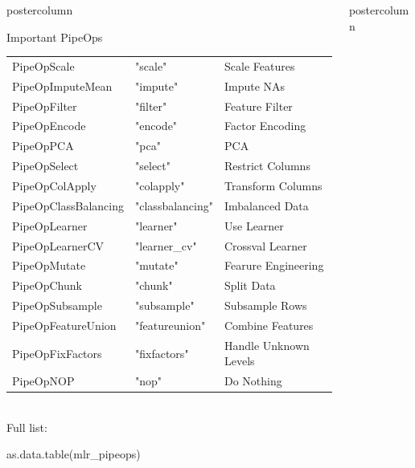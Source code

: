 \documentclass{beamer}
\newcommand{\codeinline}[1]{\begin{codeboxinline}#1\end{codeboxinline}}
\begin{document}
\begin{frame}[fragile]{}
\begin{columns}
\begin{column}{.245\textwidth}
\begin{beamercolorbox}[center]{postercolumn}
\begin{minipage}{.98\textwidth}
{\begin{myblock}{Important PipeOps}
\begin{footnotesize}
\begin{centering}
\begin{tabular}{l l l}
                    PipeOpScale & "scale" & Scale Features\\
                    PipeOpImputeMean & "impute" & Impute NAs\\
                    PipeOpFilter & "filter" & Feature Filter\\
                    PipeOpEncode & "encode" & Factor Encoding\\
                    PipeOpPCA & "pca" & PCA\\
                    PipeOpSelect & "select" & Restrict Columns\\ 
                    PipeOpColApply & "colapply" & Transform Columns\\ 
                    PipeOpClassBalancing & "classbalancing" & Imbalanced Data\\
                    PipeOpLearner & "learner" & Use Learner\\
                    PipeOpLearnerCV & "learner\_cv" & Crossval Learner\\
                    PipeOpMutate & "mutate" & Fearure Engineering\\ 
                    PipeOpChunk & "chunk" & Split Data\\ 
                    PipeOpSubsample & "subsample" & Subsample Rows\\ 
                    PipeOpFeatureUnion & "featureunion" & Combine Features\\ 
                    PipeOpFixFactors & "fixfactors" & Handle Unknown Levels\\
                    PipeOpNOP & "nop" & Do Nothing\\
                    \hline
                  \end{tabular}
                \end{centering}
              \end{footnotesize}
              \ \\
              Full list: \codeinline{as.data.table(mlr\_pipeops)}
						\end{myblock}
           	\vfill}
				\end{minipage}
			\end{beamercolorbox}
		\end{column}
		\begin{column}{.245\textwidth}
			\begin{beamercolorbox}[center]{postercolumn}
				\begin{minipage}{.98\textwidth}

\end{minipage}
\end{beamercolorbox}
\end{column}
\end{columns}
\end{frame}
\end{document}
